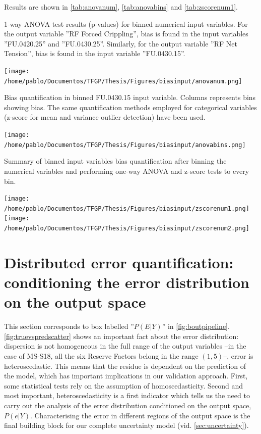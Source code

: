 \indent Results are shown in \autoref{tab:anovanum}, \autoref{tab:anovabins} and \autoref{tab:zscorenum1}.

\begin{table}[!htb]
	\centering
	\caption{1-way ANOVA test results (p-values) for binned numerical input variables. For the output variable ''RF Forced Crippling'', bias is found in the input variables ''FU.0420.25'' and ''FU.0430.25''. Similarly, for the output variable ''RF Net Tension'', bias is found in the input variable ''FU.0430.15''. }
	\texttt{[image: /home/pablo/Documentos/TFGP/Thesis/Figures/biasinput/anovanum.png]}
	\label{tab:anovanum}
\end{table}

\begin{table}[!htb]
	\centering
	\caption{Bias quantification in binned FU.0430.15 input variable. Columns represents bins showing bias. The same quantification methods employed for categorical variables (z-score for mean and variance outlier detection) have been used.}
	\texttt{[image: /home/pablo/Documentos/TFGP/Thesis/Figures/biasinput/anovabins.png]}
	\label{tab:anovabins}
\end{table}

\begin{table}[!htb]
	\centering
	\caption{Summary of binned input variables bias quantification after binning the numerical variables and performing one-way ANOVA and z-score tests to every bin.}
	\texttt{[image: /home/pablo/Documentos/TFGP/Thesis/Figures/biasinput/zscorenum1.png]}
	\texttt{[image: /home/pablo/Documentos/TFGP/Thesis/Figures/biasinput/zscorenum2.png]}
	\label{tab:zscorenum1}
\end{table}

\clearpage
\mbox{}
\clearpage
\section{Distributed error quantification: conditioning the error distribution on the output space}\label{sec:biasoutput}
This section corresponds to box labelled ''$P(E|Y)$'' in \autoref{fig:boutpipeline}.\\
\autoref{fig:truevspredscatter} shows an important fact about the error distribution: dispersion is not homogeneous in the full range of the output variables --in the case of MS-S18, all the six Reserve Factors belong in the range $(1,5)$--, \ie error is heteroscedastic. This means that the residue is dependent on the prediction of the model, which has important implications in our validation approach. First, some statistical tests rely on the assumption of homoscedasticity. Second and most important, heteroscedasticity is a first indicator which tells us the need to carry out the analysis of the error distribution conditioned on the output space, $P(e|Y)$. Characterising the error in different regions of the output space is the final building block for our complete uncertainty model (vid. \autoref{sec:uncertainty}).

